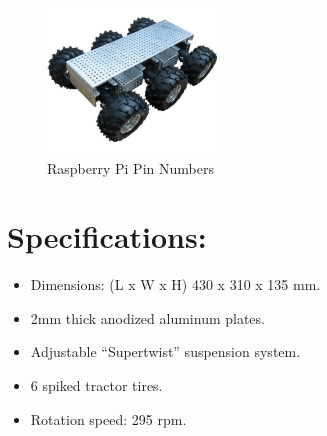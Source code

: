 \begin{figure}[h]
    \centering
    \includegraphics[width=0.4\textwidth]{figures/Wild Thumper.jpg}
    \caption{Raspberry Pi Pin Numbers}
\end{figure}

\section*{ Specifications: }
\begin{itemize}
    \item Dimensions: (L x W x H) 430 x 310 x 135 mm.
    \item 2mm thick anodized aluminum plates.
    \item Adjustable “Supertwist” suspension system.
    \item 6 spiked tractor tires.
    \item Rotation speed: 295 rpm.
\end{itemize}


